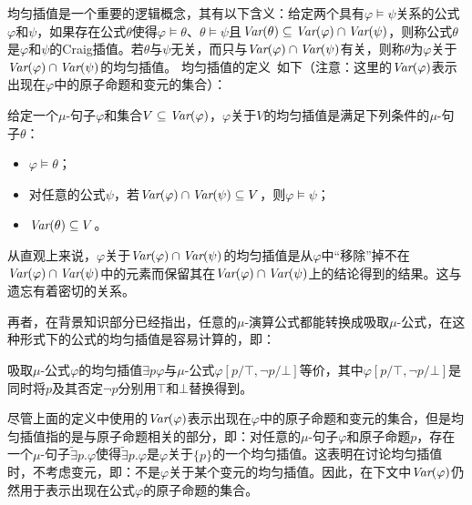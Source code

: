 均匀插值是一个重要的逻辑概念，其有以下含义：给定两个具有$\varphi\models\psi$关系的公式$\varphi$和$\psi$，如果存在公式$\theta$使得$\varphi\models \theta$、$\theta \models \psi$且$\textit{Var}(\theta) \subseteq \textit{Var}(\varphi) \cap \textit{Var}(\psi)$，则称公式$\theta$是$\varphi$和$\psi$的Craig插值。若$\theta$与$\psi$无关，而只与$\textit{Var}(\varphi) \cap \textit{Var}(\psi)$有关，则称$\theta$为$\varphi$关于$\textit{Var}(\varphi) \cap \textit{Var}(\psi)$的均匀插值。
均匀插值的定义~\cite{d2006modal}如下（注意：这里的$\textit{Var}(\varphi)$表示出现在$\varphi$中的原子命题和变元的集合）：                                                                                                                                                                                                                                              
\begin{definition}
	给定一个$\mu$-句子$\varphi$和集合$V\subseteq \textit{Var}(\varphi)$，$\varphi$关于$V$的均匀插值是满足下列条件的$\mu$-句子$\theta$：
	\begin{itemize}
		\item $\varphi \models \theta$；
		\item 对任意的公式$\psi$，若$\textit{Var}(\varphi) \cap \textit{Var}(\psi)\subseteq V$，则$\varphi \models \psi$；
		\item $\textit{Var}(\theta) \subseteq V$。 
	\end{itemize}
\end{definition}


从直观上来说，$\varphi$关于$\textit{Var}(\varphi) \cap \textit{Var}(\psi)$的均匀插值是从$\varphi$中“移除”掉不在$\textit{Var}(\varphi) \cap \textit{Var}(\psi)$中的元素而保留其在$\textit{Var}(\varphi) \cap \textit{Var}(\psi)$上的结论得到的结果。这与遗忘有着密切的关系。

再者，在背景知识部分已经指出，任意的$\mu$-演算公式都能转换成吸取$\mu$-公式，在这种形式下的公式的均匀插值是容易计算的，即：
\begin{theorem}
	吸取$\mu$-公式$\varphi$的均匀插值$\exists p \varphi$与$\mu$-公式$\varphi[p/\top, \neg p/ \bot]$等价，其中$\varphi[p/\top, \neg p/ \bot]$是同时将$p$及其否定$\neg p$分别用$\top$和$\bot$替换得到。
\end{theorem}



尽管上面的定义中使用的$\textit{Var}(\varphi)$表示出现在$\varphi$中的原子命题和变元的集合，但是均匀插值指的是与原子命题相关的部分，即：对任意的$\mu$-句子$\varphi$和原子命题$p$，存在一个$\mu$-句子$\widetilde{\exists} p. \varphi$使得$\widetilde{\exists} p. \varphi$是$\varphi$关于$\{p\}$的一个均匀插值。这表明在讨论均匀插值时，不考虑变元，即：不是$\varphi$关于某个变元的均匀插值。因此，在下文中$\textit{Var}(\varphi)$仍然用于表示出现在公式$\varphi$的原子命题的集合。%

